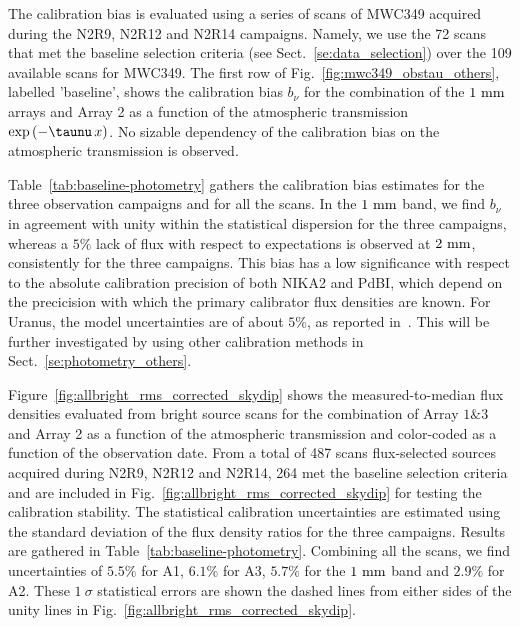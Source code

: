 The calibration bias is evaluated using a
series of scans of MWC349 acquired during the N2R9, N2R12 and N2R14
campaigns. Namely, we use the 72 scans that met the baseline selection
criteria (see Sect.~\ref{se:data_selection}) over the 109 available
scans for MWC349. The first row of
Fig.~\ref{fig:mwc349_obstau_others}, labelled 'baseline', shows the
calibration bias $b_{\nu}$ for the combination of the $1~\rm{mm}$ arrays and
Array 2 as a function of the atmospheric transmission %
$\exp \left( - \taunu \, x \right)$. No sizable dependency of the
calibration bias on the atmospheric transmission is observed. 

Table~\ref{tab:baseline-photometry} gathers the calibration bias
estimates for the three observation campaigns and for all the scans.
In the $1~\rm{mm}$ band, we find
$b_\nu$ in agreement with unity within the statistical dispersion for
the three campaigns,
whereas a $5\%$ lack of flux with respect to expectations is observed
at $2~\rm{mm}$, consistently for the three campaigns. This bias has a
low significance with respect to the absolute calibration precision of
both NIKA2 and PdBI, which depend on the precicision with which the
primary calibrator flux densities are known. For Uranus, the model
uncertainties are of about $5\%$, as reported
in~\citet{Morenothesis,Bendo2013}. This will be further investigated
by using other calibration methods in Sect.~\ref{se:photometry_others}.

Figure~\ref{fig:allbright_rms_corrected_skydip} shows the
measured-to-median flux densities evaluated from bright source scans
for the combination of Array $1\&3$ and Array 2 as a function of the
atmospheric transmission and color-coded as a function of the
observation date. From a total of 487 scans
flux-selected sources acquired during N2R9, N2R12 and N2R14, 264 met
the baseline selection criteria and are included in
Fig.~\ref{fig:allbright_rms_corrected_skydip} for testing the
calibration stability. The statistical calibration uncertainties are
estimated using the standard deviation of the flux density ratios for
the three campaigns. Results are gathered in
Table~\ref{tab:baseline-photometry}.
Combining all the scans, we find uncertainties of $5.5\%$ for A1,
$6.1\%$ for A3, $5.7\%$ for the $1~\rm{mm}$ band and $2.9\%$ for A2.
These $1~\sigma$ statistical errors are shown the dashed lines from
either sides of the unity lines in
Fig.~\ref{fig:allbright_rms_corrected_skydip}.



